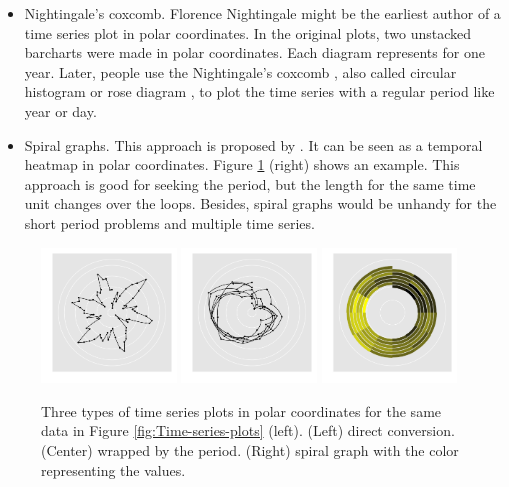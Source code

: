 \documentclass[12pt]{article}
\begin{document}
\begin{itemize} \itemsep 0in
\item Nightingale's coxcomb. Florence Nightingale might be the earliest
author of a time series plot in polar coordinates. In the original
plots, two unstacked barcharts were made in polar coordinates. Each
diagram represents for one year. Later, people use the Nightingale's
coxcomb \citep{nightingale1858notes}, also called circular histogram
or rose diagram \citep{nemec1988shape}, to plot the time series with
a regular period like year or day.
\item Spiral graphs. This approach is proposed by \citet{weber2001visualizing}.
It can be seen as a temporal heatmap in polar coordinates. Figure 
\ref{fig:polar-axis} (right) shows an example. This approach
is good for seeking the period, but the length for the same time unit
changes over the loops. Besides, spiral graphs would be unhandy for
the short period problems and multiple time series.
\end{itemize}

\begin{center}
\begin{figure}[htp]
\begin{centering}
\includegraphics[width=0.32\textwidth]{graph/pipeline-03-polarline}
\includegraphics[width=0.32\textwidth]{graph/pipeline-03-polarperiod}
\includegraphics[width=0.32\textwidth]{graph/pipeline-03-spiral}
\end{centering}
\caption{\label{fig:polar-axis}Three types of time series plots
in polar coordinates for the same data in Figure
\ref{fig:Time-series-plots} (left).
(Left) direct conversion. (Center) wrapped by the period.
(Right) spiral graph with the color representing the values.}
\end{figure}
\end{center}
\end{document}
